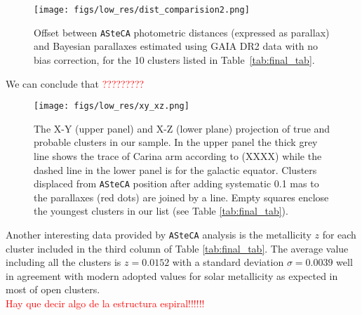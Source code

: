 \documentclass{aa}
\begin{document}
\begin{figure}[ht]
    \centering
    \texttt{[image: figs/low\_res/dist\_comparision2.png]}
    \caption{Offset between \texttt{ASteCA} photometric distances (expressed
    as parallax) and Bayesian parallaxes estimated using GAIA DR2 data with no
    bias correction, for the 10 clusters listed in Table~\ref{tab:final_tab}.}
    \label{fig:dist_compar2}
\end{figure}

We can conclude that \textcolor{red}{?????????}\\

\begin{figure}[ht]
    \centering
    \texttt{[image: figs/low\_res/xy\_xz.png]}
    \caption{The X-Y (upper panel) and X-Z (lower plane) projection of true and
    probable clusters in our sample. In the upper panel the thick grey line
    shows the trace of Carina arm according to (XXXX) while the dashed line in
    the lower panel is for the galactic equator. Clusters displaced from 
    \texttt{ASteCA} position after adding systematic 0.1 mas to the parallaxes 
    (red dots) are joined by a line. Empty squares enclose the youngest clusters
    in our list (see Table \ref{tab:final_tab}).}
    \label{fig68}
\end{figure}

Another interesting data provided by \texttt{ASteCA} analysis is the metallicity
$z$ for each cluster included in the third column of Table \ref{tab:final_tab}.
The average value including all the clusters is $z = 0.0152$ with a standard
deviation $\sigma = 0.0039$ well in agreement with modern adopted values for
solar metallicity as expected in most of open clusters.\\

\textcolor{red}{Hay que decir algo de la estructura espiral!!!!!!}




\end{document}
